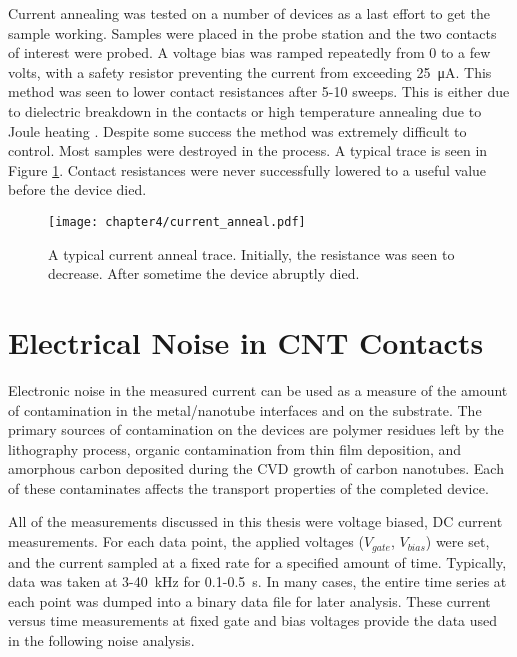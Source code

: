 Current annealing was tested on a number of devices as a last effort to get the sample working. Samples were placed in the probe station and the two contacts of interest were probed. A voltage bias was ramped repeatedly from 0 to a few volts, with a safety resistor preventing the current from exceeding \SI{25}{\micro\ampere}. This method was seen to lower contact resistances after 5-10 sweeps. This is either due to dielectric breakdown in the contacts or high temperature annealing due to Joule heating \cite{Maki2004, Woo2007, Dong2007}. Despite some success the method was extremely difficult to control. Most samples were destroyed in the process. A typical trace is seen in Figure \ref{fig:current_anneal}. Contact resistances were never successfully lowered to a useful value before the device died.

\begin{figure}
    \centering
    \texttt{[image: chapter4/current\_anneal.pdf]}
    \caption{A typical current anneal trace. Initially, the resistance was seen to decrease. After sometime the device abruptly died.}
    \label{fig:current_anneal}
\end{figure}
    
\section{Electrical Noise in CNT Contacts}

Electronic noise in the measured current can be used as a measure of the amount of contamination in the metal/nanotube interfaces and on the substrate. The primary sources of contamination on the devices are polymer residues left by the lithography process, organic contamination from thin film deposition, and amorphous carbon deposited during the CVD growth of carbon nanotubes. Each of these contaminates affects the transport properties of the completed device. 

All of the measurements discussed in this thesis were voltage biased, DC current measurements. For each data point, the applied voltages ($V_{gate}$, $V_{bias}$) were set, and the current sampled at a fixed rate for a specified amount of time. Typically, data was taken at 3-\SI{40}{\kilo\hertz} for 0.1-\SI{0.5}{\second}. In many cases, the entire time series at each point was dumped into a binary data file for later analysis. These current versus time measurements at fixed gate and bias voltages provide the data used in the following noise analysis.

